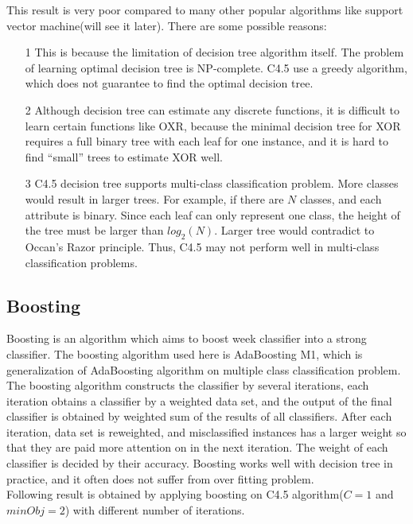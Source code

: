 \documentclass[a4paper,11pt]{article}
\begin{document}
This result is very poor compared to many other popular algorithms like support vector machine(will see it later). There are some possible reasons:\\
\begin{enumerate}
\item[1] This is because the limitation of decision tree algorithm itself. The problem of learning optimal decision tree is NP-complete\cite{DT_NPC}. C4.5 use a greedy algorithm, which does not guarantee to find the optimal decision tree.\\
\item[2] Although decision tree can estimate any discrete functions, it is difficult to learn certain functions like OXR, because the minimal decision tree for XOR requires a full binary tree with each leaf for one instance, and it is hard to find ``small'' trees to estimate XOR well.
\item[3] C4.5 decision tree supports multi-class classification problem. More classes would result in larger trees. For example, if there are $N$ classes, and each attribute is binary. Since each leaf can only represent one class, the height of the tree must be larger than $log_2(N)$. Larger tree would contradict to Occan's Razor principle. Thus, C4.5 may not perform well in multi-class classification problems.
\end{enumerate}

\subsection{Boosting}
Boosting is an algorithm which aims to boost week classifier into a strong classifier. The boosting algorithm used here is AdaBoosting M1, which is
generalization of AdaBoosting algorithm on multiple class classification problem.\\
The boosting algorithm constructs the classifier by several iterations, each iteration obtains a classifier by a weighted data set, and the output of the final classifier is obtained by weighted sum of the results of all classifiers. After each iteration, data set is reweighted, and misclassified instances has a larger weight so that they are paid more attention on in the next iteration. The weight of each classifier is decided by their accuracy. Boosting works well with decision tree in practice, and it often does not suffer from over fitting problem.\\
Following result is obtained by applying boosting on C4.5 algorithm($C=1$ and $minObj=2$) with different number of iterations.
\end{document}
